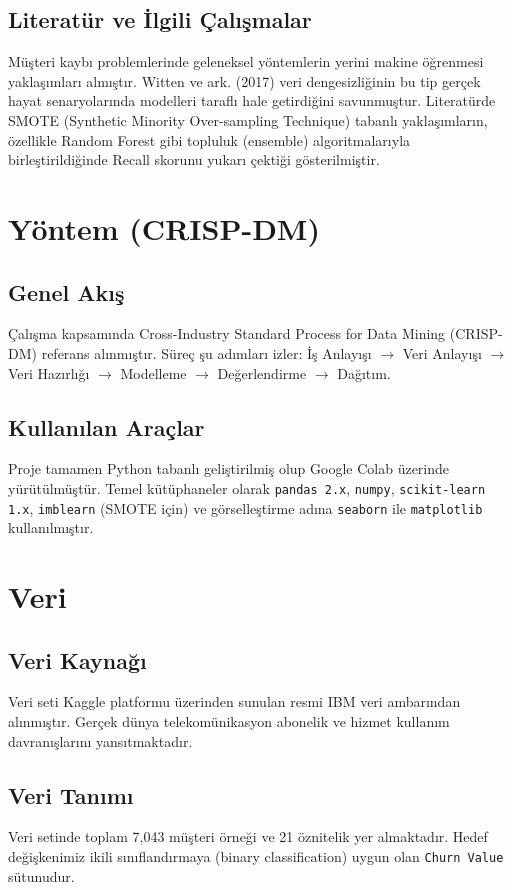 \documentclass[11pt,a4paper]{article}
\begin{document}
\subsection{Literatür ve İlgili Çalışmalar}
Müşteri kaybı problemlerinde geleneksel yöntemlerin yerini makine öğrenmesi yaklaşımları almıştır. Witten ve ark. (2017) veri dengesizliğinin bu tip gerçek hayat senaryolarında modelleri taraflı hale getirdiğini savunmuştur. Literatürde SMOTE (Synthetic Minority Over-sampling Technique) tabanlı yaklaşımların, özellikle Random Forest gibi topluluk (ensemble) algoritmalarıyla birleştirildiğinde Recall skorunu yukarı çektiği gösterilmiştir.

	\section{Yöntem (CRISP-DM)}
\subsection{Genel Akış}
Çalışma kapsamında Cross-Industry Standard Process for Data Mining (CRISP-DM) referans alınmıştır. Süreç şu adımları izler: İş Anlayışı $\rightarrow$ Veri Anlayışı $\rightarrow$ Veri Hazırlığı $\rightarrow$ Modelleme $\rightarrow$ Değerlendirme $\rightarrow$ Dağıtım.

\subsection{Kullanılan Araçlar}
Proje tamamen Python tabanlı geliştirilmiş olup Google Colab üzerinde yürütülmüştür. Temel kütüphaneler olarak \texttt{pandas 2.x}, \texttt{numpy}, \texttt{scikit-learn 1.x}, \texttt{imblearn} (SMOTE için) ve görselleştirme adına \texttt{seaborn} ile \texttt{matplotlib} kullanılmıştır.

\section{Veri}
\subsection{Veri Kaynağı}
Veri seti Kaggle platformu üzerinden sunulan resmi IBM veri ambarından alınmıştır. Gerçek dünya telekomünikasyon abonelik ve hizmet kullanım davranışlarını yansıtmaktadır.

\subsection{Veri Tanımı}
Veri setinde toplam 7,043 müşteri örneği ve 21 öznitelik yer almaktadır. Hedef değişkenimiz ikili sınıflandırmaya (binary classification) uygun olan \texttt{Churn Value} sütunudur.
\end{document}
